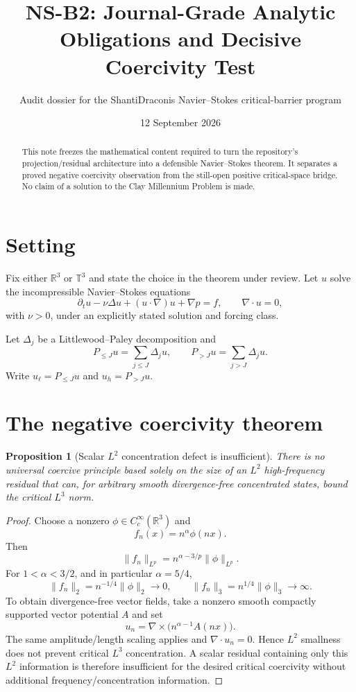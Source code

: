 \documentclass[11pt]{article}
\title{NS-B2: Journal-Grade Analytic Obligations and Decisive Coercivity Test}
\author{Audit dossier for the ShantiDraconis Navier--Stokes critical-barrier program}
\date{12 September 2026}
\newtheorem{proposition}{Proposition}
\begin{document}
\maketitle

\begin{abstract}
This note freezes the mathematical content required to turn the repository's projection/residual architecture into a defensible Navier--Stokes theorem. It separates a proved negative coercivity observation from the still-open positive critical-space bridge. No claim of a solution to the Clay Millennium Problem is made.
\end{abstract}

\section{Setting}
Fix either $\mathbb R^3$ or $\mathbb T^3$ and state the choice in the theorem under review. Let $u$ solve the incompressible Navier--Stokes equations
\begin{equation}
 \partial_tu-\nu\Delta u+(u\cdot\nabla)u+\nabla p=f,
 \qquad \nabla\cdot u=0,
\end{equation}
with $\nu>0$, under an explicitly stated solution and forcing class.

Let $\Delta_j$ be a Littlewood--Paley decomposition and
\[
P_{\le J}u=\sum_{j\le J}\Delta_j u,
\qquad
P_{>J}u=\sum_{j>J}\Delta_j u.
\]
Write $u_\ell=P_{\le J}u$ and $u_h=P_{>J}u$.

\section{The negative coercivity theorem}
\begin{proposition}[Scalar $L^2$ concentration defect is insufficient]
There is no universal coercive principle based solely on the size of an $L^2$ high-frequency residual that can, for arbitrary smooth divergence-free concentrated states, bound the critical $L^3$ norm.
\end{proposition}
\begin{proof}
Choose a nonzero $\phi\in C_c^\infty(\mathbb R^3)$ and
\[
f_n(x)=n^\alpha\phi(nx).
\]
Then
\[
\|f_n\|_{L^p}=n^{\alpha-3/p}\|\phi\|_{L^p}.
\]
For $1<\alpha<3/2$, and in particular $\alpha=5/4$,
\[
\|f_n\|_2=n^{-1/4}\|\phi\|_2\to0,
\qquad
\|f_n\|_3=n^{1/4}\|\phi\|_3\to\infty.
\]
To obtain divergence-free vector fields, take a nonzero smooth compactly supported vector potential $A$ and set
\[
u_n=\nabla\times\bigl(n^{\alpha-1}A(nx)\bigr).
\]
The same amplitude/length scaling applies and $\nabla\cdot u_n=0$. Hence $L^2$ smallness does not prevent critical $L^3$ concentration. A scalar residual containing only this $L^2$ information is therefore insufficient for the desired critical coercivity without additional frequency/concentration information.
\end{proof}
\end{document}
